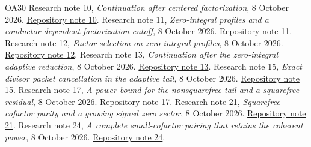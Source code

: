 \documentclass[11pt]{article}
\numberwithin{equation}{section}
\theoremstyle{definition}
\theoremstyle{remark}
\begin{document}
\begin{thebibliography}{OA30}
Research note 10, \emph{Continuation after centered factorization}, 8 October 2026.
\href{notes/10_SHORT_FAMILY_FACTORIZATION_CONTINUATION_20261008.md}{Repository note 10}.
Research note 11, \emph{Zero-integral profiles and a conductor-dependent factorization cutoff}, 8 October 2026.
\href{notes/11_SHORT_FAMILY_MEAN_ZERO_ADAPTIVE_REDUCTION_20261008.md}{Repository note 11}.
Research note 12, \emph{Factor selection on zero-integral profiles}, 8 October 2026.
\href{notes/12_SHORT_FAMILY_FACTOR_SELECTION_BARRIER_20261008.md}{Repository note 12}.
Research note 13, \emph{Continuation after the zero-integral adaptive reduction}, 8 October 2026.
\href{notes/13_SHORT_FAMILY_ADAPTIVE_CONTINUATION_20261008.md}{Repository note 13}.
Research note 15, \emph{Exact divisor packet cancellation in the adaptive tail}, 8 October 2026.
\href{notes/15_SHORT_FAMILY_DIVISOR_PACKET_CANCELLATION_20261008.md}{Repository note 15}.
Research note 17, \emph{A power bound for the nonsquarefree tail and a squarefree residual}, 8 October 2026.
\href{notes/17_SHORT_FAMILY_SQUAREFREE_TAIL_REDUCTION_20261008.md}{Repository note 17}.
Research note 21, \emph{Squarefree cofactor parity and a growing signed zero sector}, 8 October 2026.
\href{notes/21_SHORT_FAMILY_ROUGH_PARITY_20261008.md}{Repository note 21}.
Research note 24, \emph{A complete small-cofactor pairing that retains the coherent power}, 8 October 2026.
\href{notes/24_SHORT_FAMILY_FINITE_COFACTOR_PAIRING_20261008.md}{Repository note 24}.
\end{thebibliography}
\end{document}
